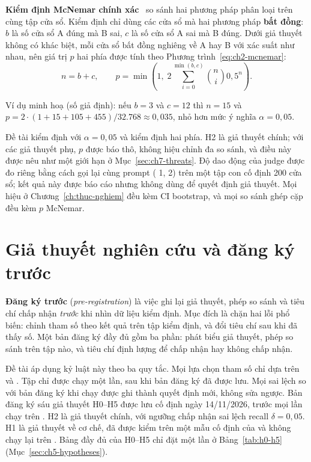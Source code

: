 \textbf{Kiểm định McNemar chính xác}~\cite{mcnemar1947note} so sánh hai phương pháp phân loại trên cùng tập cửa sổ. Kiểm định chỉ dùng các cửa sổ mà hai phương pháp \textbf{bất đồng}: $b$ là số cửa sổ A đúng mà B sai, $c$ là số cửa sổ A sai mà B đúng. Dưới giả thuyết không có khác biệt, mỗi cửa sổ bất đồng nghiêng về A hay B với xác suất như nhau, nên giá trị $p$ hai phía được tính theo Phương trình~\eqref{eq:ch2-mcnemar}:
\begin{equation}
  n = b + c, \qquad
  p = \min\!\left(1,\; 2 \sum_{i=0}^{\min(b, c)} \binom{n}{i} 0{,}5^n\right).
  \label{eq:ch2-mcnemar}
\end{equation}

Ví dụ minh hoạ (số giả định): nếu $b = 3$ và $c = 12$ thì $n = 15$ và $p = 2 \cdot (1 + 15 + 105 + 455) / 32.768 \approx 0{,}035$, nhỏ hơn mức ý nghĩa $\alpha = 0{,}05$.

Đề tài kiểm định với $\alpha = 0{,}05$ và kiểm định hai phía. H2 là giả thuyết chính; với các giả thuyết phụ, $p$ được báo thô, không hiệu chỉnh đa so sánh, và điều này được nêu như một giới hạn ở Mục~\ref{sec:ch7-threats}. Độ dao động của judge được đo riêng bằng cách gọi lại cùng prompt ( 1, 2) trên một tập con cố định 200 cửa sổ; kết quả này được báo cáo nhưng không dùng để quyết định giả thuyết. Mọi hiệu ở Chương~\ref{ch:thuc-nghiem} đều kèm CI bootstrap, và mọi so sánh ghép cặp đều kèm $p$ McNemar.

\section{Giả thuyết nghiên cứu và đăng ký trước}
\label{sec:ch2-dang-ky}

\textbf{Đăng ký trước} (\emph{pre-registration}) là việc ghi lại giả thuyết, phép so sánh và tiêu chí chấp nhận \emph{trước} khi nhìn dữ liệu kiểm định. Mục đích là chặn hai lỗi phổ biến: chỉnh tham số theo kết quả trên tập kiểm định, và đổi tiêu chí sau khi đã thấy số. Một bản đăng ký đầy đủ gồm ba phần: phát biểu giả thuyết, phép so sánh trên tập nào, và tiêu chí định lượng để chấp nhận hay không chấp nhận.

Đề tài áp dụng kỷ luật này theo ba quy tắc. Mọi lựa chọn tham số chỉ dựa trên  và . Tập  chỉ được chạy một lần, sau khi bản đăng ký đã được lưu. Mọi sai lệch so với bản đăng ký khi chạy được ghi thành quyết định mới, không sửa ngược. Bản đăng ký sáu giả thuyết H0--H5 được lưu cố định ngày 14/11/2026, trước mọi lần chạy trên . H2 là giả thuyết chính, với ngưỡng chấp nhận sai lệch recall $\delta = 0{,}05$. H1 là giả thuyết về cơ chế, đã được kiểm trên một mẫu cố định của  và không chạy lại trên . Bảng đầy đủ của H0--H5 chỉ đặt một lần ở Bảng~\ref{tab:h0-h5} (Mục~\ref{sec:ch5-hypotheses}).

